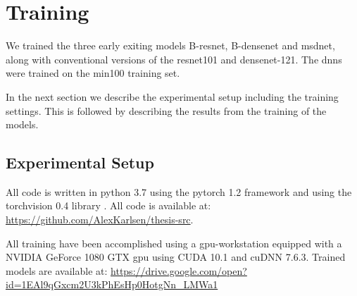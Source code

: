 
\section{Training}

We trained the three early exiting models B-\gls{resnet}, B-\gls{densenet} and \gls{msdnet}, along with conventional versions of the \gls{resnet}101 and \gls{densenet}-121. The \gls{dnn}s were trained on the \gls{min100} training set.

In the next section we describe the experimental setup including the training settings. This is followed by describing the results from the training of the models.

\subsection{Experimental Setup}

All code is written in \gls{python} 3.7 \cite{van_rossum_python_1995} using the \gls{pytorch} 1.2
framework \cite{paszke_automatic_2017} and using the \gls{torchvision} 0.4 library \cite{marcel_torchvision_2010}. All code is available at:
{\color{sns-grey}\url{https://github.com/AlexKarlsen/thesis-src}}. 

All training have been accomplished using a \gls{gpu}-workstation equipped with a NVIDIA GeForce 1080 GTX \gls{gpu} using CUDA 10.1 and cuDNN 7.6.3. Trained models are available at: {\color{sns-grey}\url{https://drive.google.com/open?id=1EAl9qGxcm2U3kPhEsHp0HotgNn_LMWa1}} 



